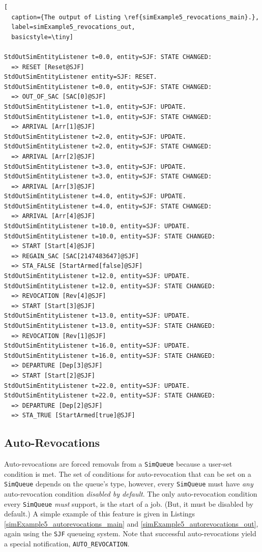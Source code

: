 \documentclass[12pt]{book}
\begin{document}
\begin{lstfloat}
\begin{lstlisting}[
  caption={The output of Listing \ref{simExample5_revocations_main}.},
  label=simExample5_revocations_out,
  basicstyle=\tiny]

StdOutSimEntityListener t=0.0, entity=SJF: STATE CHANGED:
  => RESET [Reset@SJF]
StdOutSimEntityListener entity=SJF: RESET.
StdOutSimEntityListener t=0.0, entity=SJF: STATE CHANGED:
  => OUT_OF_SAC [SAC[0]@SJF]
StdOutSimEntityListener t=1.0, entity=SJF: UPDATE.
StdOutSimEntityListener t=1.0, entity=SJF: STATE CHANGED:
  => ARRIVAL [Arr[1]@SJF]
StdOutSimEntityListener t=2.0, entity=SJF: UPDATE.
StdOutSimEntityListener t=2.0, entity=SJF: STATE CHANGED:
  => ARRIVAL [Arr[2]@SJF]
StdOutSimEntityListener t=3.0, entity=SJF: UPDATE.
StdOutSimEntityListener t=3.0, entity=SJF: STATE CHANGED:
  => ARRIVAL [Arr[3]@SJF]
StdOutSimEntityListener t=4.0, entity=SJF: UPDATE.
StdOutSimEntityListener t=4.0, entity=SJF: STATE CHANGED:
  => ARRIVAL [Arr[4]@SJF]
StdOutSimEntityListener t=10.0, entity=SJF: UPDATE.
StdOutSimEntityListener t=10.0, entity=SJF: STATE CHANGED:
  => START [Start[4]@SJF]
  => REGAIN_SAC [SAC[2147483647]@SJF]
  => STA_FALSE [StartArmed[false]@SJF]
StdOutSimEntityListener t=12.0, entity=SJF: UPDATE.
StdOutSimEntityListener t=12.0, entity=SJF: STATE CHANGED:
  => REVOCATION [Rev[4]@SJF]
  => START [Start[3]@SJF]
StdOutSimEntityListener t=13.0, entity=SJF: UPDATE.
StdOutSimEntityListener t=13.0, entity=SJF: STATE CHANGED:
  => REVOCATION [Rev[1]@SJF]
StdOutSimEntityListener t=16.0, entity=SJF: UPDATE.
StdOutSimEntityListener t=16.0, entity=SJF: STATE CHANGED:
  => DEPARTURE [Dep[3]@SJF]
  => START [Start[2]@SJF]
StdOutSimEntityListener t=22.0, entity=SJF: UPDATE.
StdOutSimEntityListener t=22.0, entity=SJF: STATE CHANGED:
  => DEPARTURE [Dep[2]@SJF]
  => STA_TRUE [StartArmed[true]@SJF]

\end{lstlisting}
\end{lstfloat}

\subsection{Auto-Revocations}

Auto-revocations are forced removals from a \lstinline|SimQueue|
  because a user-set condition is met.
The set of conditions for auto-revocation
  that can be set on a \lstinline|SimQueue|
  depends on the queue's type,
  however,
  every \lstinline|SimQueue|
  must have {\em any\/}
  auto-revocation condition
  {\em disabled by default}.
The only auto-revocation condition
  every \lstinline|SimQueue| {\em must\/}
  support, is the start of a job.
(But, it must be disabled by default.)
A simple example of this feature is given
  in Listings \ref{simExample5_autorevocations_main}
  and \ref{simExample5_autorevocations_out},
  again using the \lstinline|SJF|
  queueing system.
Note that successful auto-revocations
  yield a special notification,
  \lstinline|AUTO_REVOCATION|.
\end{document}
